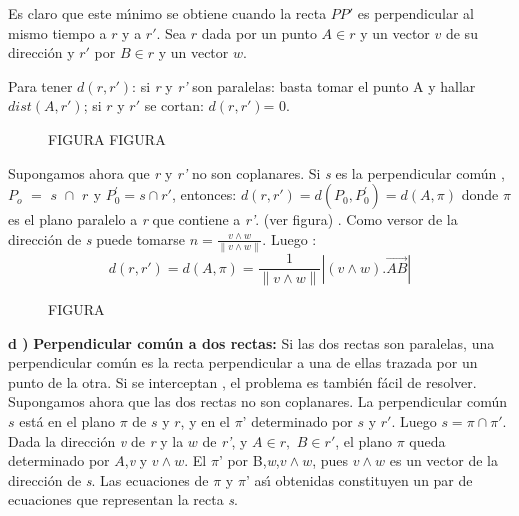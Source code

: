 Es claro que este m\'{\i}nimo se obtiene cuando la recta $PP'$ es
perpendicular al mismo tiempo a $r $ y a $r'$. Sea $ r $ dada por
un punto $A \in r$ y un vector $v$  de su direcci\'{o}n y $r'$ por
$B \in r$ y un vector $w$.


Para tener $d\left( {r,r'} \right)$: si \textit{r} y \textit{r'}
son paralelas: basta tomar el punto A y hallar $dist\left( {A,r'}
\right)$; si $r$ y $r'$ se cortan: $d\left( {r,r'} \right)$= 0.


\begin{figure}[htb]
\centering
FIGURA%
FIGURA%
\end{figure}
%

\bigskip

Supongamos ahora que \textit{r} y \textit{r'} no son coplanares.
Si \textit{s} es la perpendicular com\'{u}n , $P_{o} \,\, =
\,\,s\,\, \cap \,\,r^{}$  y  $P_{0}^{'}  = s \cap r'$, entonces:
 $d\left( {r,r'} \right) = d\left( {P_{0}^{} ,P_{0}^{'} } \right) = d\left(
{A,\pi } \right)$ donde $\pi $  es el plano paralelo a \textit{r}
que contiene a \textit{r'}. (ver figura) . Como versor de la
direcci\'{o}n de \textit{s} puede tomarse $n = \frac{{v \wedge
w}}{{\left\| {v \wedge w} \right\|}}$. Luego :
\[
d\left( {r,r'} \right) = d\left( {A,\pi } \right) =
\frac{{1}}{{\left\| {v \wedge w} \right\|}}\left| {\left( {v
\wedge w} \right).\overrightarrow{AB} } \right|
\]


\begin{figure}[htb]
\centering
FIGURA
\end{figure}
%
%
\bigskip

\textbf{d ) }\textbf {Perpendicular com\'{u}n a dos rectas:} Si
las dos rectas son paralelas, una perpendicular com\'{u}n es la
recta perpendicular a una de ellas trazada por un punto de la
otra. Si se interceptan , el problema es tambi\'{e}n f\'{a}cil de
resolver. Supongamos ahora que las dos rectas no son coplanares.
La perpendicular com\'{u}n $s$ est\'{a} en el plano $\pi $ de $s$
y $r$, y en el $\pi $' determinado por $s$ y $r'$. Luego $s = \pi
\cap \pi '$. Dada la direcci\'{o}n \textit{v }de \textit{r} y la
$w$ de \textit{r'}, y $A \in r,\,\,B \in r'$, el plano $\pi $
queda determinado por $A$,\textit{v} y $v \wedge w$. El $\pi $'
por B,\textit{w},$v \wedge w$, pues $v \wedge w$ es un vector de
la direcci\'{o}n de \textit{s}. Las ecuaciones de $\pi $ y $\pi $'
as\'{\i} obtenidas constituyen un par de ecuaciones que
representan la recta \textit{s}.
\bigskip

